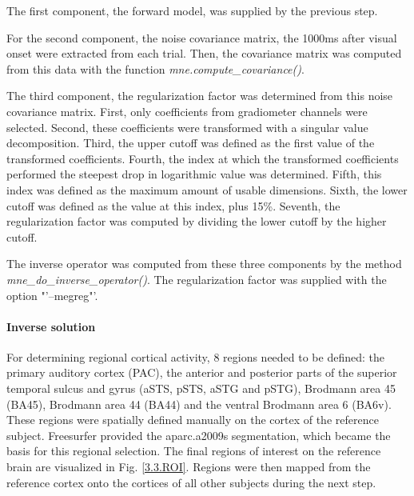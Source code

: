 The first component, the forward model, was supplied by the previous step.

For the second component, the noise covariance matrix, the 1000ms after visual onset were extracted from each trial.
Then, the covariance matrix was computed from this data with the function \emph{mne.compute\_covariance()}.

The third component, the regularization factor was determined from this noise covariance matrix.
First, only coefficients from gradiometer channels were selected.
Second, these coefficients were transformed with a singular value decomposition.
Third, the upper cutoff was defined as the first value of the transformed coefficients.
Fourth, the index at which the transformed coefficients performed the steepest drop in logarithmic value was determined.
Fifth, this index was defined as the maximum amount of usable dimensions.
Sixth, the lower cutoff was defined as the value at this index, plus 15\%.
Seventh, the regularization factor was computed by dividing the lower cutoff by the higher cutoff.


The inverse operator was computed from these three components by the method \linebreak \emph{mne\_do\_inverse\_operator()}. The regularization factor was supplied with the option \linebreak "'--megreg"'.

\paragraph{Inverse solution}
For determining regional cortical activity, 8 regions needed to be defined: the primary auditory cortex (PAC), the anterior and posterior parts of the superior temporal sulcus and gyrus (aSTS, pSTS, aSTG and pSTG), Brodmann area 45 (BA45), Brodmann area 44 (BA44) and the ventral Brodmann area 6 (BA6v).
These regions were spatially defined manually on the cortex of the reference subject.
Freesurfer provided the aparc.a2009s segmentation, which became the basis for this regional selection.
The final regions of interest on the reference brain are visualized in Fig. \ref{3.3.ROI}.
Regions were then mapped from the reference cortex onto the cortices of all other subjects during the next step.

